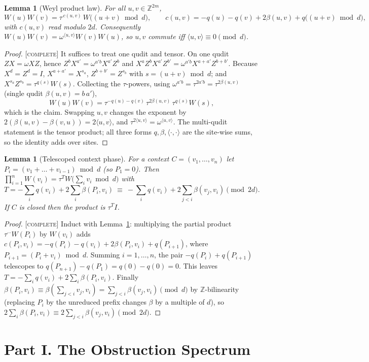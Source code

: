 \documentclass[11pt]{article}
\newtheorem{lemma}[theorem]{Lemma}
\theoremstyle{definition}
\theoremstyle{remark}
\newcommand{\Z}{\mathbb{Z}}
\newcommand{\ip}[2]{\langle #1,#2\rangle}
\newcommand{\CO}{\textnormal{\textsc{[complete]}}}
\begin{document}
\begin{lemma}[Weyl product law]\label{lem:product}
For all $u,v\in\Z^{2m}$,
\[
W(u)W(v)=\tau^{\,c(u,v)}\,W\bigl((u+v)\bmod d\bigr),\qquad
c(u,v)=-q(u)-q(v)+2\beta(u,v)+q\bigl((u+v)\bmod d\bigr),
\]
with $c(u,v)$ read modulo $2d$. Consequently $W(u)W(v)=\omega^{\ip{u}{v}}W(v)W(u)$, so $u,v$
commute iff $\ip{u}{v}\equiv0\pmod d$.
\end{lemma}
\begin{proof}
\CO{} It suffices to treat one qudit and tensor. On one qudit $ZX=\omega XZ$, hence
$Z^bX^{a'}=\omega^{a'b}X^{a'}Z^b$ and
$X^aZ^bX^{a'}Z^{b'}=\omega^{a'b}X^{a+a'}Z^{b+b'}$. Because $X^d=Z^d=I$, $X^{a+a'}=X^{s_a}$,
$Z^{b+b'}=Z^{s_b}$ with $s=(u+v)\bmod d$; and $X^{s_a}Z^{s_b}=\tau^{q(s)}W(s)$. Collecting the
$\tau$-powers, using $\omega^{a'b}=\tau^{2a'b}=\tau^{2\beta(u,v)}$ (single qudit
$\beta(u,v)=b\,a'$),
\[
W(u)W(v)=\tau^{-q(u)-q(v)}\,\tau^{2\beta(u,v)}\,\tau^{q(s)}W(s),
\]
which is the claim. Swapping $u,v$ changes the exponent by $2(\beta(u,v)-\beta(v,u))=2\ip{u}{v}$,
and $\tau^{2\ip{u}{v}}=\omega^{\ip{u}{v}}$. The multi-qudit statement is the tensor product; all
three forms $q,\beta,\ip{\cdot}{\cdot}$ are the site-wise sums, so the identity adds over sites.
\end{proof}

\begin{lemma}[Telescoped context phase]\label{lem:telescope}
For a context $C=(v_1,\dots,v_n)$ let $P_i=(v_1+\dots+v_{i-1})\bmod d$ (so $P_1=0$). Then
$\prod_{i=1}^nW(v_i)=\tau^{T}W\bigl(\sum_iv_i\bmod d\bigr)$ with
\[
T=-\sum_{i}q(v_i)+2\sum_{i}\beta(P_i,v_i)\ \equiv\ -\sum_iq(v_i)+2\!\!\sum_{j<i}\beta(v_j,v_i)
\pmod{2d}.
\]
If $C$ is closed then the product is $\tau^{T}I$.
\end{lemma}
\begin{proof}
\CO{} Induct with Lemma~\ref{lem:product}: multiplying the partial product
$\tau^{\cdots}W(P_{i})$ by $W(v_i)$ adds $c(P_i,v_i)=-q(P_i)-q(v_i)+2\beta(P_i,v_i)+q(P_{i+1})$,
where $P_{i+1}=(P_i+v_i)\bmod d$. Summing $i=1,\dots,n$, the pair $-q(P_i)+q(P_{i+1})$ telescopes to
$q(P_{n+1})-q(P_1)=q(0)-q(0)=0$. This leaves $T=-\sum_iq(v_i)+2\sum_i\beta(P_i,v_i)$. Finally
$\beta(P_i,v_i)\equiv\beta(\sum_{j<i}v_j,v_i)=\sum_{j<i}\beta(v_j,v_i)\pmod d$ by $\Z$-bilinearity
(replacing $P_i$ by the unreduced prefix changes $\beta$ by a multiple of $d$), so
$2\sum_i\beta(P_i,v_i)\equiv2\sum_{j<i}\beta(v_j,v_i)\pmod{2d}$.
\end{proof}

\part*{Part I. The Obstruction Spectrum}
\end{document}
